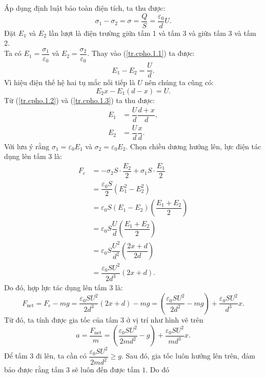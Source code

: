 \begin{loigiai}
\begin{enumerate}[1)]
\begin{center}
\begin{tikzpicture}[x=0.75pt,y=0.75pt,yscale=-1.75,xscale=1.75]
            
            \end{tikzpicture}
        \end{center}
        Áp dụng định luật bảo toàn điện tích, ta thu được:
        \[\sigma_1-\sigma_2=\sigma=\dfrac{Q}{S}=\dfrac{\varepsilon_0}{d}U. \tag{1}\label{tr.cpho.1.1} \]
        Đặt $E_1$ và $E_2$ lần lượt là điện trường giữa tấm 1 và tấm 3 và giữa tấm 3 và tấm 2. 
        \\Ta có $E_1=\dfrac{\sigma_1}{\varepsilon_0}$ và $E_2=\dfrac{\sigma_2}{\varepsilon_0}$. Thay vào (\ref{tr.cpho.1.1}) ta được:
        \[E_1-E_2=\dfrac{U}{d}. \tag{2}\label{tr.cpho.1.2}\]
        Vì hiệu điện thế hệ hai tụ mắc nối tiếp là $U$ nên chúng ta cũng có:
        \[E_2 x-E_1\left(d-x\right)=U. \tag{3}\label{tr.cpho.1.3}\]
        Từ (\ref{tr.cpho.1.2}) và (\ref{tr.cpho.1.3}) ta thu được:
        \begin{align}
            E_1 &= \dfrac{U}{d} \dfrac{d+x}{d}, \tag{4}\label{tr.cpho.1.4}\\
            E_2 &=\dfrac{U}{d} \dfrac{x}{d}. \tag{5}\label{tr.cpho.1.5}
        \end{align}
        Với lưu ý rằng $\sigma_1=\varepsilon_0 E_1$ và $\sigma_2=\varepsilon_0 E_2$. Chọn chiều dương hướng lên, lực điện tác dụng lên tấm $3$ là:
        \[\begin{aligned}
            F_e &=-\sigma_2 S \cdot \dfrac{E_2}{2}+\sigma_1 S \cdot \dfrac{E_1}{2}\\
            &= \dfrac{\varepsilon_0S}{2}\left(E_1^2-E_2^2\right)\\
            &=\varepsilon_0S\left(E_1-E_2\right)\left(\dfrac{E_1+E_2}{2}\right)\\
            &=\varepsilon_0S\dfrac{U}{d}\left(\dfrac{E_1+E_2}{2}\right)\\
            &=\varepsilon_0 S\dfrac{U^2}{d^2}\left(\dfrac{2x+d}{2d}\right)\\
            &=\dfrac{\varepsilon_0SU^2}{2d^3}\left(2x+d\right). 
        \end{aligned}\tag{6}\label{tr.cpho.1.6}\]
        Do đó, hợp lực tác dụng lên tấm $3$ là:
        \[F_{\text{net}}=F_e-mg=\dfrac{\varepsilon_0SU^2}{2d^3}\left(2x+d\right)-mg=\left(\dfrac{\varepsilon_0SU^2}{2d^2}-mg\right)+\dfrac{\varepsilon_0SU^2}{d^3}x.\]
        Từ đó, ta tính được gia tốc của tấm $3$ ở vị trí như hình vẽ trên 
        \[a=\dfrac{F_{\text{net}}}{m}=\left(\dfrac{\varepsilon_0SU^2}{2md^2}-g\right)+\dfrac{\varepsilon_0SU^2}{md^3}x.\tag{7}\label{tr.cpho.1.7}\]
        Để tấm $3$ đi lên, ta cần có $\dfrac{\varepsilon_0SU^2}{2md^2}\geqslant g$. Sau đó, gia tốc luôn hướng lên trên, đảm bảo được rằng tấm $3$ sẽ luôn đến được tấm $1$. Do đó

\end{enumerate}
\end{loigiai}
